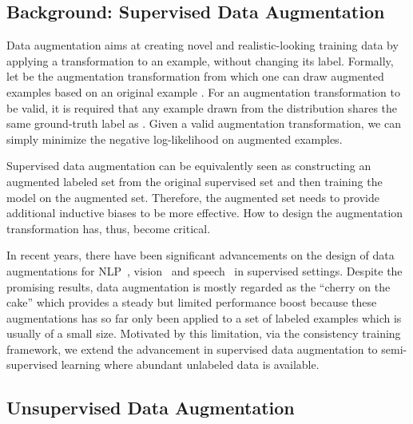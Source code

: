 \documentclass{article}
\begin{document}
\subsection{Background: Supervised Data Augmentation}
\label{sec:sda}
\vspace{-0.5em}

Data augmentation aims at creating novel and realistic-looking training data by applying a transformation to an example, without changing its label.
Formally, let  be the augmentation transformation from which one can draw augmented examples  based on an original example .
For an augmentation transformation to be valid, it is required that any example  drawn from the distribution shares the same ground-truth label as .
Given a valid augmentation transformation, we can simply minimize the negative log-likelihood on augmented examples. 

Supervised data augmentation can be equivalently seen as constructing an augmented labeled set from the original supervised set and then training the model on the augmented set. Therefore, the augmented set needs to provide additional inductive biases to be more effective. How to design the augmentation transformation has, thus, become critical. 

In recent years, there have been significant advancements on the design of data augmentations for NLP~\cite{yu2018qanet}, vision~\cite{krizhevsky2012imagenet,cubuk2018autoaugment} and speech~\cite{hannun2014deep,park2019specaugment} in supervised settings.
Despite the promising results, data augmentation is mostly regarded as the ``cherry on the cake'' which provides a steady but limited performance boost because these augmentations has so far only been applied to a set of labeled examples which is usually of a small size. 
Motivated by this limitation, via the consistency training framework, we extend the advancement in supervised data augmentation to semi-supervised learning where abundant unlabeled data is available. 

\vspace{-0.3em}
\subsection{Unsupervised Data Augmentation}
\label{sec:uda}
\vspace{-0.3em}
\end{document}
